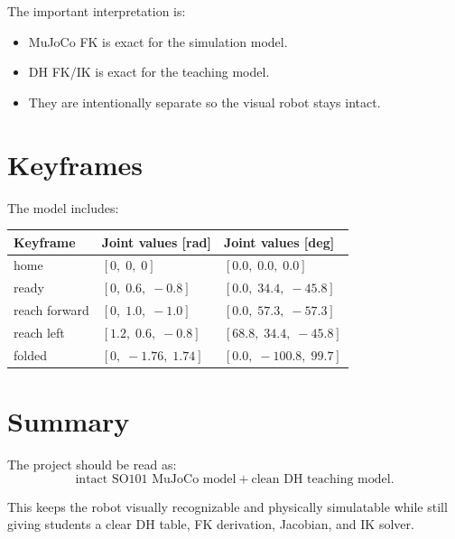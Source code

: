 \documentclass[11pt]{article}
\begin{document}
The important interpretation is:
\begin{itemize}[leftmargin=1.3em]
  \item MuJoCo FK is exact for the simulation model.
  \item DH FK/IK is exact for the teaching model.
  \item They are intentionally separate so the visual robot stays intact.
\end{itemize}

\section{Keyframes}
The model includes:
\begin{center}
\begin{tabular}{@{}lll@{}}
\toprule
Keyframe & Joint values [rad] & Joint values [deg] \\
\midrule
home & \([0,\;0,\;0]\) & \([0.0,\;0.0,\;0.0]\) \\
ready & \([0,\;0.6,\;-0.8]\) & \([0.0,\;34.4,\;-45.8]\) \\
reach forward & \([0,\;1.0,\;-1.0]\) & \([0.0,\;57.3,\;-57.3]\) \\
reach left & \([1.2,\;0.6,\;-0.8]\) & \([68.8,\;34.4,\;-45.8]\) \\
folded & \([0,\;-1.76,\;1.74]\) & \([0.0,\;-100.8,\;99.7]\) \\
\bottomrule
\end{tabular}
\end{center}

\section{Summary}
The project should be read as:
\[
\text{intact SO101 MuJoCo model} + \text{clean DH teaching model}.
\]

This keeps the robot visually recognizable and physically simulatable while
still giving students a clear DH table, FK derivation, Jacobian, and IK solver.
\end{document}
